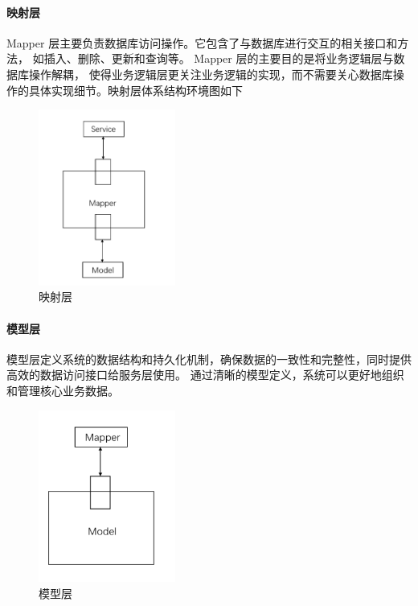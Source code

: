 \documentclass[12pt]{ctexart} %
\begin{document}
\paragraph{映射层}

Mapper 层主要负责数据库访问操作。它包含了与数据库进行交互的相关接口和方法，
如插入、删除、更新和查询等。 Mapper 层的主要目的是将业务逻辑层与数据库操作解耦，
使得业务逻辑层更关注业务逻辑的实现，而不需要关心数据库操作的具体实现细节。映射层体系结构环境图如下

\begin{figure}[htbp]
  \centering 
  \includegraphics[width=0.4\textwidth]{map.png}
  \caption{映射层}
\end{figure}

\paragraph{模型层}
模型层定义系统的数据结构和持久化机制，确保数据的一致性和完整性，同时提供高效的数据访问接口给服务层使用。
通过清晰的模型定义，系统可以更好地组织和管理核心业务数据。

\begin{figure}[htbp]
  \centering 
  \includegraphics[width=0.4\textwidth]{model.png}
  \caption{模型层}
\end{figure}
\end{document}
